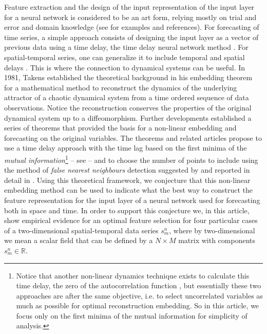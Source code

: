 \documentclass[journal]{IEEEtran}
\begin{document}
Feature extraction and the design of the input
representation of the 
input layer for a neural network is considered to be an art form, relying mostly on trial and error and domain knowledge (see \cite{5771385}
for examples and references). For 
forecasting of time series, a simple approach consists of designing the input layer as a vector of previous data using a time delay, the 
time delay neural network method \cite{Waibel:1990:PRU:108235.108263, luk2000study, 857903, Frank2001, OH2002249, 1009-1963-12-6-304, 
inputlayer}. For spatial-temporal series, one can generalize it to include temporal and spatial delays 
\cite{covas2016,covaspeixinhojoao}. This is where the connection to dynamical systems can be useful. In 1981, Takens established the 
theoretical background \cite{1981LNM...898..366T} in his embedding theorem for a mathematical method to reconstruct the dynamics 
of the underlying attractor of a chaotic dynamical system from a time ordered sequence of data observations. Notice the reconstruction 
conserves the properties of the original dynamical system up to a diffeomorphism. 
 Further developments established a series of theorems \cite{key1503303m, 1981LNM...898..230M, 1991JSP....65..579S}
 that provided the basis for a non-linear embedding and forecasting on the original variables. The 
theorems and related articles propose to use a time delay approach with the time lag based on the first minima of the 
{\em mutual information}\footnote{
Notice that another non-linear dynamics technique exists to calculate this time delay, the zero of the autocorrelation
function \cite{opac-b1092652,abarbanel1997analysis}, but essentially these two approaches are after the same objective, i.e.
to select uncorrelated 
 variables as much as possible for optimal reconstruction embedding. So in this article, we focus only on the first minima
 of the mutual information for simplicity of analysis.
} -- see 
\cite{Fraser86, abarbanel1997analysis, opac-b1092652} -- and to choose the number of points to include using  the method of {\em false 
nearest neighbours} detection suggested by \cite{1992PhRvA..45.3403K} and reported in detail in \cite{1992PhRvA..45.7058M, 
1993RvMP...65.1331A, 1996PhT....49k..86A, abarbanel1997analysis}. Using this theoretical framework, we conjecture that this non-linear 
embedding method can be used to indicate what the best way to construct the feature representation for 
the input layer of a neural network used for forecasting both in space and time.
In order to support this conjecture we, in this article, show empirical evidence for an optimal feature selection 
 for four particular cases of a two-dimensional
spatial-temporal data series $s^n_m$, where by two-dimensional we mean a scalar field that can be
defined by a $N \times M$ matrix with components $s^n_m \in \mathbb{R}$.
\end{document}
